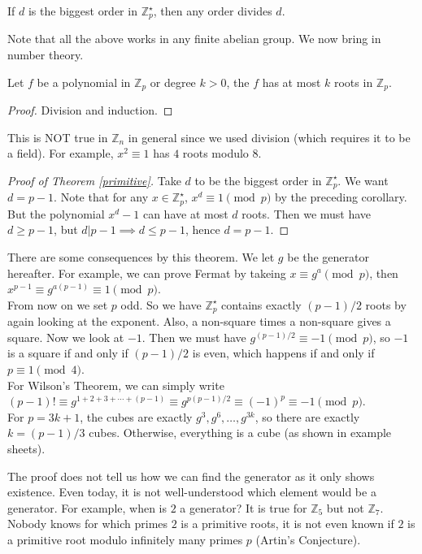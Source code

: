 \begin{corollary}
    If $d$ is the biggest order in $\mathbb Z_p^\star$, then any order divides $d$.
\end{corollary}
Note that all the above works in any finite abelian group.
We now bring in number theory.
\begin{proposition}
    Let $f$ be a polynomial in $\mathbb Z_p$ or degree $k>0$, the $f$ has at most $k$ roots in $\mathbb Z_p$.
\end{proposition}
\begin{proof}
    Division and induction.
\end{proof}
\begin{remark}
    This is NOT true in $\mathbb Z_n$ in general since we used division (which requires it to be a field).
    For example, $x^2\equiv 1$ has $4$ roots modulo $8$.
\end{remark}
\begin{proof}[Proof of Theorem \ref{primitive}]
    Take $d$ to be the biggest order in $\mathbb Z_p^\star$.
    We want $d=p-1$.
    Note that for any $x\in\mathbb Z_p^\star$, $x^d\equiv 1\pmod{p}$ by the preceding corollary.
    But the polynomial $x^d-1$ can have at most $d$ roots.
    Then we must have $d\ge p-1$, but $d|p-1\implies d\le p-1$, hence $d=p-1$.
\end{proof}
There are some consequences by this theorem.
We let $g$ be the generator hereafter.
For example, we can prove Fermat by takeing $x\equiv g^a\pmod{p}$, then $x^{p-1}\equiv g^{a(p-1)}\equiv 1\pmod{p}$.\\
From now on we set $p$ odd.
So we have $\mathbb Z_p^\star$ contains exactly $(p-1)/2$ roots by again looking at the exponent.
Also, a non-square times a non-square gives a square.
Now we look at $-1$.
Then we must have $g^{(p-1)/2}\equiv -1\pmod{p}$, so $-1$ is a square if and only if $(p-1)/2$ is even, which happens if and only if $p\equiv 1\pmod{4}$.\\
For Wilson's Theorem, we can simply write $(p-1)!\equiv g^{1+2+3+\cdots +(p-1)}\equiv g^{p(p-1)/2}\equiv (-1)^p\equiv -1\pmod{p}$.\\
For $p=3k+1$, the cubes are exactly $g^3,g^6,\ldots,g^{3k}$, so there are exactly $k=(p-1)/3$ cubes.
Otherwise, everything is a cube (as shown in example sheets).
\begin{remark}
    The proof does not tell us how we can find the generator as it only shows existence.
    Even today, it is not well-understood which element would be a generator.
    For example, when is $2$ a generator?
    It is true for $\mathbb Z_5$ but not $\mathbb Z_7$.
    Nobody knows for which primes $2$ is a primitive roots, it is not even known if $2$ is a primitive root modulo infinitely many primes $p$ (Artin's Conjecture).
\end{remark}